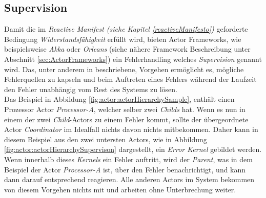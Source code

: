 \subsection{Supervision}\label{actor:supervision}
Damit die im \textit{Reactive Manifest (siehe Kapitel \ref{reactiveManifesto})} geforderte Bedingung \textit{Widerstandsfähigkeit} erfüllt wird, bieten Actor Frameworks, wie beispielsweise \textit{Akka} oder \textit{Orleans} (siehe nähere Framework Beschreibung unter Abschnitt \ref{sec:ActorFrameworks}) ein Fehlerhandling welches \textit{Supervision} genannt wird. Das, unter anderem in \cite{sargent2016play} beschriebene, Vorgehen ermöglicht es, mögliche Fehlerquellen zu kapseln und beim Auftreten eines Fehlers während der Laufzeit den Fehler unabhängig vom Rest des Systems zu lösen.\\
Das Beispiel in Abbildung \ref{fig:actor:actorHierarchySample}, enthält einen Prozessor Actor \textit{Processor-A}, welcher selber zwei \textit{Childs} hat. Wenn es nun in einem der zwei \textit{Child}-Actors zu einem Fehler kommt, sollte der übergeordnete Actor \textit{Coordinator} im Idealfall nichts davon nichts mitbekommen. Daher kann in diesem Beispiel aus den zwei untersten Actors, wie in Abbildung \ref{fig:actor:actorHierarchySupervison} dargestellt, ein \textit{Error Kernel} gebildet werden. Wenn innerhalb dieses \textit{Kernels} ein Fehler auftritt, wird der \textit{Parent}, was in dem Beispiel der Actor \textit{Processor-A} ist, über den Fehler benachrichtigt, und kann dann darauf entsprechend reagieren. Alle anderen Actors im System bekommen von diesem Vorgehen nichts mit und arbeiten ohne Unterbrechung weiter. \\
